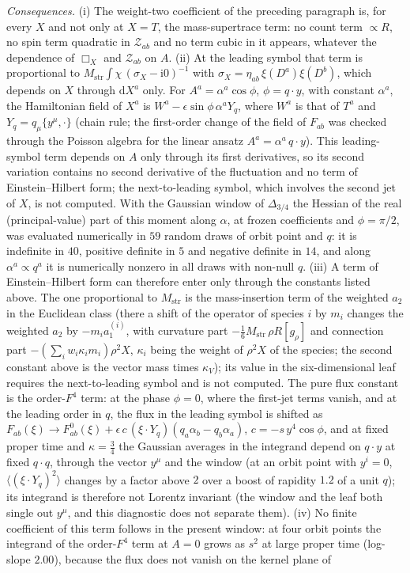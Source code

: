\emph{Consequences.} (i) The weight-two coefficient of the preceding paragraph is, for every \(X\) and not only at \(X=T\), the mass-supertrace term: no count term \(\propto R\), no spin term quadratic in \(\mathcal Z_{ab}\) and no term cubic in it appears, whatever the dependence of \(\Box_X\) and \(\mathcal Z_{ab}\) on \(A\). (ii) At the leading symbol that term is proportional to \(M_{\mathrm{str}}\int\chi\,(\sigma_X-\mathrm i0)^{-1}\) with \(\sigma_X=\eta_{ab}\,\xi(D^a)\xi(D^b)\), which depends on \(X\) through \(\mathrm dX^a\) only. For \(A^a=\alpha^a\cos\phi\), \(\phi=q\cdot y\), with constant \(\alpha^a\), the Hamiltonian field of \(X^a\) is \(W^a-\epsilon\sin\phi\,\alpha^aY_q\), where \(W^a\) is that of \(T^a\) and \(Y_q=q_\mu\{y^\mu,\cdot\}\) (chain rule; the first-order change of the field of \(F_{ab}\) was checked through the Poisson algebra for the linear ansatz \(A^a=\alpha^a\,q\cdot y\)). This leading-symbol term depends on \(A\) only through its first derivatives, so its second variation contains no second derivative of the fluctuation and no term of Einstein--Hilbert form; the next-to-leading symbol, which involves the second jet of \(X\), is not computed. With the Gaussian window of \(\Delta_{3/4}\) the Hessian of the real (principal-value) part of this moment along \(\alpha\), at frozen coefficients and \(\phi=\pi/2\), was evaluated numerically in \(59\) random draws of orbit point and \(q\): it is indefinite in \(40\), positive definite in \(5\) and negative definite in \(14\), and along \(\alpha^a\propto q^a\) it is numerically nonzero in all draws with non-null \(q\). (iii) A term of Einstein--Hilbert form can therefore enter only through the constants listed above. The one proportional to \(M_{\mathrm{str}}\) is the mass-insertion term of the weighted \(a_2\) in the Euclidean class (there a shift of the operator of species \(i\) by \(m_i\) changes the weighted \(a_2\) by \(-m_ia_1^{(i)}\), with curvature part \(-\tfrac16M_{\mathrm{str}}\,\rho R[g_\rho]\) and connection part \(-(\sum_iw_i\kappa_im_i)\rho^2X\), \(\kappa_i\) being the weight of \(\rho^2X\) of the species; the second constant above is the vector mass times \(\kappa_V\)); its value in the six-dimensional leaf requires the next-to-leading symbol and is not computed. The pure flux constant is the order-\(F^4\) term: at the phase \(\phi=0\), where the first-jet terms vanish, and at the leading order in \(q\), the flux in the leading symbol is shifted as \(F_{ab}(\xi)\to F^0_{ab}(\xi)+\epsilon\,c\,(\xi\cdot Y_q)(q_a\alpha_b-q_b\alpha_a)\), \(c=-s\,y^4\cos\phi\), and at fixed proper time and \(\kappa=\tfrac34\) the Gaussian averages in the integrand depend on \(q\cdot y\) at fixed \(q\cdot q\), through the vector \(y^\mu\) and the window (at an orbit point with \(y^i=0\), \(\langle(\xi\cdot Y_q)^2\rangle\) changes by a factor above \(2\) over a boost of rapidity \(1.2\) of a unit \(q\)); its integrand is therefore not Lorentz invariant (the window and the leaf both single out \(y^\mu\), and this diagnostic does not separate them). (iv) No finite coefficient of this term follows in the present window: at four orbit points the integrand of the order-\(F^4\) term at \(A=0\) grows as \(s^2\) at large proper time (log-slope \(2.00\)), because the flux does not vanish on the kernel plane of 